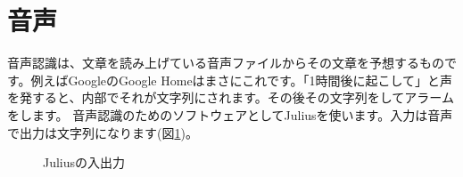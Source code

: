 \section{音声}
音声認識は、文章を読み上げている音声ファイルからその文章を予想するものです。例えばGoogleのGoogle Homeはまさにこれです。「1時間後に起こして」と声を発すると、内部でそれが文字列にされます。その後その文字列をしてアラームをします。
音声認識のためのソフトウェアとしてJuliusを使います。入力は音声で出力は文字列になります(図\ref{Juliusの入出力})。

\begin{figure}[H]
\begin{center}
    
    \caption{Juliusの入出力}
    \label{Juliusの入出力}
\end{center}
\end{figure}

\begin{tcolorbox}[title=\useOmetoi]
\begin{enumerate}
\end{enumerate}
\end{tcolorbox}
